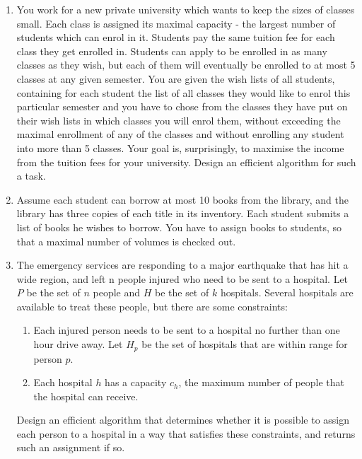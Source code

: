 \documentclass[a4paper]{article}
\begin{document}
\begin{enumerate}
		\item You work for a new private university which wants to keep the sizes of classes small. Each class is assigned its maximal capacity - the largest number of students which can enrol in it. Students pay the same tuition fee for each class they get enrolled in. Students can apply to be enrolled in as many classes as they wish, but each of them will eventually be enrolled to at most 5 classes at any given semester. You are given the wish lists of all students, containing for each student the list of all classes they would like to enrol this particular semester and you have to chose from the classes they have put on their wish lists in which classes you will enrol them, without exceeding the maximal enrollment of any of the classes and without enrolling any student into more than 5 classes. Your goal is, surprisingly, to maximise the income from the tuition fees for your university. Design an efficient algorithm for such a task.

		\item  Assume each student can borrow at most 10 books from the library, and the library has three copies of each title in its inventory. Each student submits a list of books he wishes to borrow. You have to assign books to students, so that a maximal number of volumes is checked out.


		\item The emergency services are responding to a major earthquake that has hit a wide region, and left n people injured who need to be sent to a hospital. Let $P$ be the set of $n$ people and $H$ be the set of $k$ hospitals. Several hospitals are available to treat these people, but there are some constraints:
				\begin{enumerate}[label={(\alph*)}]
						\item Each injured person needs to be sent to a hospital no further than one hour drive away. Let $H_p$ be the set of hospitals that are within range for person $p$.
						\item Each hospital $h$ has a capacity $c_h$, the maximum number of people that the hospital can receive.
				\end{enumerate}
				Design an efficient algorithm that determines whether it is possible to assign each person to a hospital in a way that satisfies these constraints, and returns such an assignment if so.
\end{enumerate}
\end{document}
